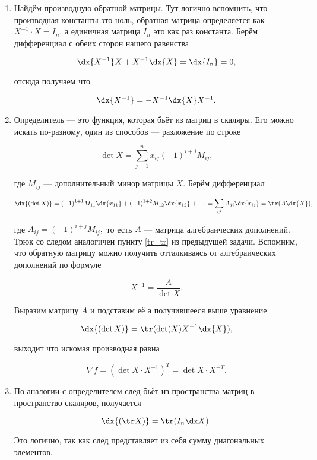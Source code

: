 \begin{sol} 
\begin{enumerate}
    \item Найдём производную обратной матрицы.  Тут логично вспомнить, что производная константы это ноль, обратная матрица определяется как $X^{-1} \cdot X = I_n$, а единичная матрица $I_n$ это как раз константа. Берём дифференциал с обеих сторон нашего равенства 
    
    \[
    \dx{X^{-1}} X + X^{-1} \dx{X} = \dx{I_n} = 0,
    \]
    
    отсюда получаем что 
    
    \[
    \dx{X^{-1}} = - X^{-1} \dx{X} X^{-1}.
    \]
    
    \item Определитель --- это функция, которая бьёт из матриц в скаляры. Его можно искать по-разному, один из способов --- разложение по строке
    
    \[
    \det X = \sum_{j = 1}^n x_{ij} (-1)^{i + j} M_{ij}, 
    \]
    
    где $M_{ij}$ --- дополнительный минор матрицы $X$. Берём дифференциал 
    
    \[
    \dx{(\det X)} = (-1)^{1 + 1} M_{11} \dx{x_{11}} + (-1)^{1 + 2} M_{12}  \dx{x_{12}} + \ldots  = \sum_{ij} A_{ji} \dx{x_{ij}} = \tr(A \dx{X}),
    \]
    
    где $A_{ij} = (-1)^{i +j} M_{ij},$ то есть $A$ --- матрица алгебраических дополнений. Трюк со следом аналогичен пункту \ref{tr_tr} из предыдущей задачи. Вспомним, что обратную матрицу можно получить отталкиваясь от алгебраических дополнений по формуле 
    
    \[
    X^{-1} = \frac{A}{\det X}.
    \]
    
    Выразим матрицу $A$ и подставим её а получившееся выше уравнение 
    
    \[
    \dx{(\det X)} = \tr(\det (X) X^{-1} \dx{X}),
    \]
    
    выходит что искомая производная равна 
    
    \[
    \nabla f = (\det X \cdot X^{-1})^T = \det X \cdot X^{-T}.
    \]
    
    \item По аналогии с определителем след бьёт из пространства матриц в пространство скаляров, получается 
    
    \[
    \dx{(\tr X)} = \tr(I_n \dx X).
    \]
    
    Это логично, так как след представляет из себя сумму диагональных элементов.
\end{enumerate} 
\end{sol}


